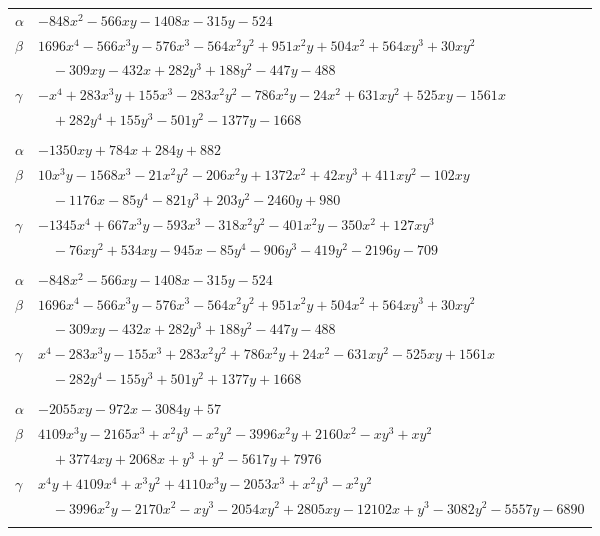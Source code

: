 \documentclass[11pt]{article}
\begin{document}
\begin{longtable}{@{}ll@{}}
$\alpha$ & $-848x^{2}-566xy-1408x-315y-524$\\
$\beta$ & $1696x^{4}-566x^{3}y-576x^{3}-564x^{2}y^{2}+951x^{2}y+504x^{2}+564xy^{3}+30xy^{2}$\\
 & $\quad -309xy-432x+282y^{3}+188y^{2}-447y-488$\\
$\gamma$ & $-x^{4}+283x^{3}y+155x^{3}-283x^{2}y^{2}-786x^{2}y-24x^{2}+631xy^{2}+525xy-1561x$\\
 & $\quad +282y^{4}+155y^{3}-501y^{2}-1377y-1668$\\
\addlinespace[3pt]
\multicolumn{2}{@{}l}{$\{i,j\}=\{4,69\}$, $k_{ij}=2\cdot 7^{2}$}\\
$\alpha$ & $-1350xy+784x+284y+882$\\
$\beta$ & $10x^{3}y-1568x^{3}-21x^{2}y^{2}-206x^{2}y+1372x^{2}+42xy^{3}+411xy^{2}-102xy$\\
 & $\quad -1176x-85y^{4}-821y^{3}+203y^{2}-2460y+980$\\
$\gamma$ & $-1345x^{4}+667x^{3}y-593x^{3}-318x^{2}y^{2}-401x^{2}y-350x^{2}+127xy^{3}$\\
 & $\quad -76xy^{2}+534xy-945x-85y^{4}-906y^{3}-419y^{2}-2196y-709$\\
\addlinespace[3pt]
\multicolumn{2}{@{}l}{$\{i,j\}=\{4,72\}$, $k_{ij}=2^{2}\cdot 3^{2}$}\\
$\alpha$ & $-848x^{2}-566xy-1408x-315y-524$\\
$\beta$ & $1696x^{4}-566x^{3}y-576x^{3}-564x^{2}y^{2}+951x^{2}y+504x^{2}+564xy^{3}+30xy^{2}$\\
 & $\quad -309xy-432x+282y^{3}+188y^{2}-447y-488$\\
$\gamma$ & $x^{4}-283x^{3}y-155x^{3}+283x^{2}y^{2}+786x^{2}y+24x^{2}-631xy^{2}-525xy+1561x$\\
 & $\quad -282y^{4}-155y^{3}+501y^{2}+1377y+1668$\\
\addlinespace[3pt]
\multicolumn{2}{@{}l}{$\{i,j\}=\{4,75\}$, $k_{ij}=3\cdot 7^{3}$}\\
$\alpha$ & $-2055xy-972x-3084y+57$\\
$\beta$ & $4109x^{3}y-2165x^{3}+x^{2}y^{3}-x^{2}y^{2}-3996x^{2}y+2160x^{2}-xy^{3}+xy^{2}$\\
 & $\quad +3774xy+2068x+y^{3}+y^{2}-5617y+7976$\\
$\gamma$ & $x^{4}y+4109x^{4}+x^{3}y^{2}+4110x^{3}y-2053x^{3}+x^{2}y^{3}-x^{2}y^{2}$\\
 & $\quad -3996x^{2}y-2170x^{2}-xy^{3}-2054xy^{2}+2805xy-12102x+y^{3}-3082y^{2}-5557y-6890$\\
\addlinespace[3pt]
\multicolumn{2}{@{}l}{$\{i,j\}=\{4,79\}$, $k_{ij}=2\cdot 7^{2}$}\\

\end{longtable}
\end{document}
